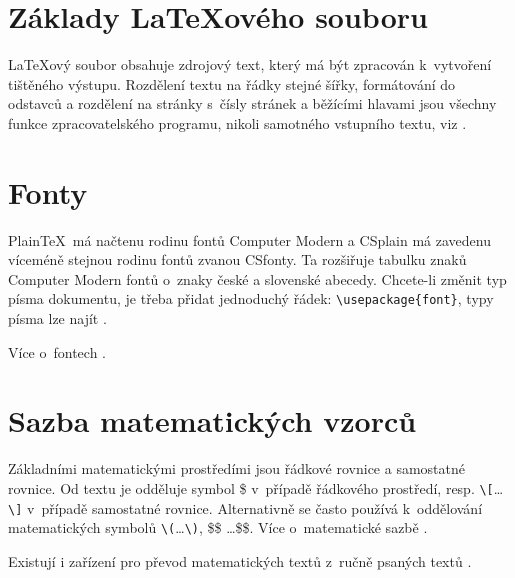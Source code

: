\documentclass[a4paper, 11pt]{article}
\begin{document}
\section{Základy \LaTeX ového souboru}
\LaTeX ový soubor obsahuje zdrojový text, který má být zpracován k~vytvoření tištěného výstupu.
Rozdělení textu na řádky stejné šířky, formátování do odstavců a rozdělení na stránky s~čísly 
stránek a běžícími hlavami jsou všechny funkce zpracovatelského programu, 
nikoli samotného vstupního textu, viz \cite{book2003}.

\section{Fonty}
Plain\TeX\ má načtenu rodinu fontů Computer Modern a CSplain má zavedenu víceméně
stejnou rodinu fontů zvanou CSfonty. Ta rozšiřuje tabulku znaků Computer Modern fontů
o~znaky české a slovenské abecedy. 
Chcete-li změnit typ písma dokumentu, je třeba přidat jednoduchý řádek:
\verb|\usepackage{font}|, 
typy písma lze najít \cite{OnlineOverleaf}.

Více o~fontech \cite{FullArticle}.

\section{Sazba matematických vzorců}
Základními matematickými prostředími jsou řádkové rovnice a samostatné rovnice. 
Od textu je odděluje symbol \$ v~případě řádkového prostředí, 
resp. \verb|\[|\dots\verb|\]| v~případě samostatné rovnice. 
Alternativně se často používá k~oddělování matematických symbolů \verb|\(|\dots\verb|\)|, \$\$ \dots \$\$. 
Více o~matematické sazbě \cite{WorkHolan}.

Existují i zařízení pro převod matematických textů z~ručně psaných textů \cite{MathArticle}.

\pagebreak


\renewcommand{\refname}{Literatura}

\end{document}
